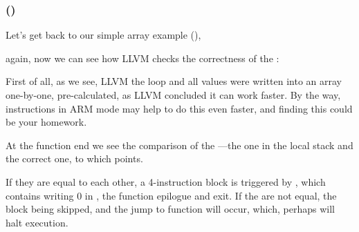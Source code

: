\subsubsection{\OptimizingXcodeIV (\ThumbTwoMode)}


Let's get back to our simple array example (),

again, now we can see how LLVM checks the correctness of the :




First of all, as we see, LLVM  the loop and all values were written into an array one-by-one,
pre-calculated, as LLVM concluded it can work faster.
By the way, instructions in ARM mode may help to do this even faster, 
and finding this could be your homework.


At the function end we see the comparison of the ---the one in the local stack and the correct one,
to which  points.

If they are equal to each other, a 4-instruction block is triggered by ,
which contains writing 0 in , the function epilogue and exit.
If the  are not equal, the block being skipped,
and the jump to 
 function will occur, which, perhaps will halt execution.
